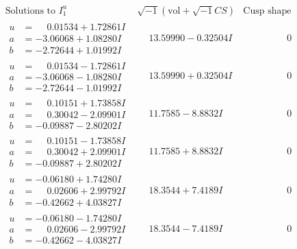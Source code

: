 \documentclass[1p]{elsarticle_modified}
\theoremstyle{definition}
\newcommand{\I}{\sqrt{-1}}
\begin{document}
$$\begin{array}{c|c|c}
 \end{array}$$\newpage$$\begin{array}{c|c|c}  
\text{Solutions to }I^u_{1}& \I (\text{vol} + \sqrt{-1}CS) & \text{Cusp shape}\\
 \hline 
\begin{aligned}
u &= \phantom{-}0.01534 + 1.72861 I \\
a &= -3.06068 + 1.08280 I \\
b &= -2.72644 + 1.01992 I\end{aligned}
 & \phantom{-}13.59990 - 0.32504 I & \phantom{-0.000000 } 0 \\ \hline\begin{aligned}
u &= \phantom{-}0.01534 - 1.72861 I \\
a &= -3.06068 - 1.08280 I \\
b &= -2.72644 - 1.01992 I\end{aligned}
 & \phantom{-}13.59990 + 0.32504 I & \phantom{-0.000000 } 0 \\ \hline\begin{aligned}
u &= \phantom{-}0.10151 + 1.73858 I \\
a &= \phantom{-}0.30042 - 2.09901 I \\
b &= -0.09887 - 2.80202 I\end{aligned}
 & \phantom{-}11.7585 - 8.8832 I & \phantom{-0.000000 } 0 \\ \hline\begin{aligned}
u &= \phantom{-}0.10151 - 1.73858 I \\
a &= \phantom{-}0.30042 + 2.09901 I \\
b &= -0.09887 + 2.80202 I\end{aligned}
 & \phantom{-}11.7585 + 8.8832 I & \phantom{-0.000000 } 0 \\ \hline\begin{aligned}
u &= -0.06180 + 1.74280 I \\
a &= \phantom{-}0.02606 + 2.99792 I \\
b &= -0.42662 + 4.03827 I\end{aligned}
 & \phantom{-}18.3544 + 7.4189 I & \phantom{-0.000000 } 0 \\ \hline\begin{aligned}
u &= -0.06180 - 1.74280 I \\
a &= \phantom{-}0.02606 - 2.99792 I \\
b &= -0.42662 - 4.03827 I\end{aligned}
 & \phantom{-}18.3544 - 7.4189 I & \phantom{-0.000000 } 0 \\ \hline\begin{aligned}

\end{aligned}
\end{array}$$
\end{document}
